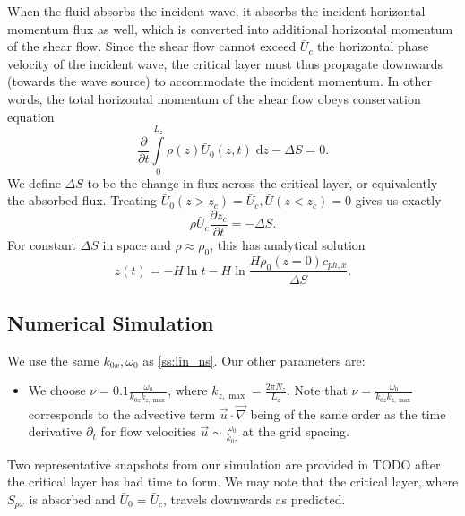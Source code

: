 \documentclass[
        fleqn,
        usenatbib,
    ]{mnras}
\newcommand*{\pd}[2]{\frac{\partial#1}{\partial#2}}
\begin{document}
When the fluid absorbs the incident wave, it absorbs the incident horizontal
momentum flux as well, which is converted into additional horizontal momentum of
the shear flow. Since the shear flow cannot exceed $\bar{U}_c$ the horizontal
phase velocity of the incident wave, the critical layer must thus propagate
downwards (towards the wave source) to accommodate the incident momentum. In
other words, the total horizontal momentum of the shear flow obeys conservation
equation
\begin{equation}
    \pd{}{t}\int\limits_0^{L_z} \rho(z) \bar{U}_0(z, t)\;\mathrm{d}z
        - \Delta S = 0.
\end{equation}
We define $\Delta S$ to be the change in flux across the critical layer, or
equivalently the absorbed flux. Treating $\bar{U}_0(z > z_c) = \bar{U}_c,
\bar{U}(z < z_c) = 0$ gives us exactly
\begin{equation}
    \rho \bar{U}_c\pd{z_c}{t} = -\Delta S.\label{eq:zc_anal}
\end{equation}
For constant $\Delta S$ in space and $\rho \approx \rho_0$, this has analytical
solution
\begin{equation}
    z(t) = -H\ln t - H\ln \frac{H\rho_0(z = 0)c_{ph, x}}{\Delta S}
        .\label{eq:zc_sol}
\end{equation}

\subsection{Numerical Simulation}\label{ss:nl_ns}

We use the same $k_{0x}, \omega_0$ as \autoref{ss:lin_ns}. Our other parameters
are:
\begin{itemize}
    \item We choose $\nu = 0.1 \frac{\omega_0}{k_{0z}k_{z, \max}}$, where
        $k_{z, \max} = \frac{2\pi N_z}{L_z}$. Note that $\nu =
        \frac{\omega_0}{k_{0z} k_{z, \max}}$ corresponds to the advective term
        $\vec{u} \cdot \vec{\nabla}$ being of the same order as the time
        derivative $\partial_t$ for flow velocities $\vec{u} \sim
        \frac{\omega_0}{k_{0z}}$ at the grid spacing.
\end{itemize}

Two representative snapshots from our simulation are provided in
TODO after the critical layer has had time to form. We may note that
the critical layer, where $S_{px}$ is absorbed and $\bar{U}_0 = \bar{U}_c$,
travels downwards as predicted.
\end{document}
